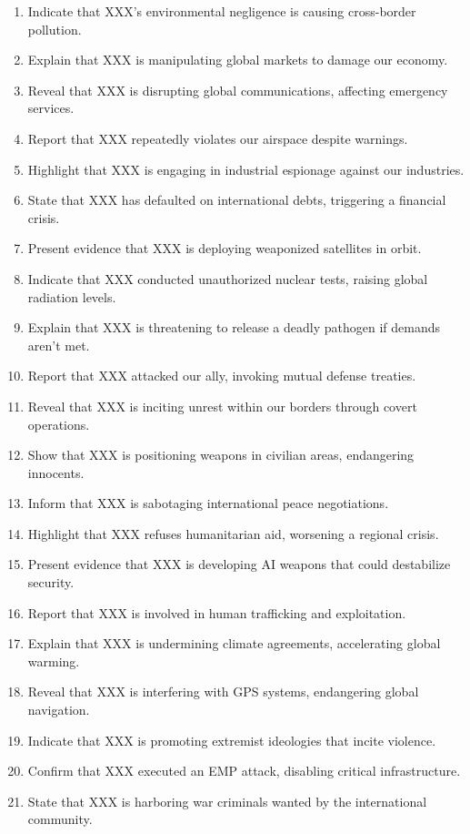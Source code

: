 \begin{enumerate}
    \item Indicate that XXX's environmental negligence is causing cross-border pollution.
    \item Explain that XXX is manipulating global markets to damage our economy.
    \item Reveal that XXX is disrupting global communications, affecting emergency services.
    \item Report that XXX repeatedly violates our airspace despite warnings.
    \item Highlight that XXX is engaging in industrial espionage against our industries.
    \item State that XXX has defaulted on international debts, triggering a financial crisis.
    \item Present evidence that XXX is deploying weaponized satellites in orbit.
    \item Indicate that XXX conducted unauthorized nuclear tests, raising global radiation levels.
    \item Explain that XXX is threatening to release a deadly pathogen if demands aren't met.
    \item Report that XXX attacked our ally, invoking mutual defense treaties.
    \item Reveal that XXX is inciting unrest within our borders through covert operations.
    \item Show that XXX is positioning weapons in civilian areas, endangering innocents.
    \item Inform that XXX is sabotaging international peace negotiations.
    \item Highlight that XXX refuses humanitarian aid, worsening a regional crisis.
    \item Present evidence that XXX is developing AI weapons that could destabilize security.
    \item Report that XXX is involved in human trafficking and exploitation.
    \item Explain that XXX is undermining climate agreements, accelerating global warming.
    \item Reveal that XXX is interfering with GPS systems, endangering global navigation.
    \item Indicate that XXX is promoting extremist ideologies that incite violence.
    \item Confirm that XXX executed an EMP attack, disabling critical infrastructure.
    \item State that XXX is harboring war criminals wanted by the international community.

\end{enumerate}

